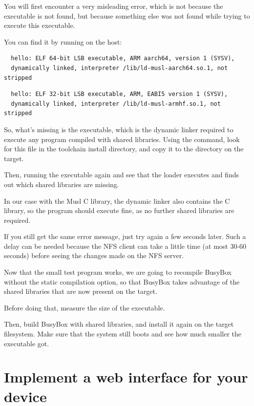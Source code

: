 You will first encounter a very misleading  error,
which is not because the  executable is not found, but
because something else was not found while trying to execute
this executable.

You can find it by running  on the host:

\if{}
\begin{verbatim}
  hello: ELF 64-bit LSB executable, ARM aarch64, version 1 (SYSV),
  dynamically linked, interpreter /lib/ld-musl-aarch64.so.1, not stripped
\end{verbatim}
\else
\begin{verbatim}
  hello: ELF 32-bit LSB executable, ARM, EABI5 version 1 (SYSV),
  dynamically linked, interpreter /lib/ld-musl-armhf.so.1, not stripped
\end{verbatim}
\fi

So, what's missing is the 
executable, which is the dynamic linker required to execute any
program compiled with shared libraries. Using the 
command, look for this file in the toolchain install directory,
and copy it to the  directory on the target.

Then, running the executable again and see that the loader executes
and finds out which shared libraries are missing.

In our case with the Musl C library, the dynamic linker also contains the
C library, so the program should execute fine, as no further shared
libraries are required.

If you still get the same error message, just try again a
few seconds later.  Such a delay can be needed because the NFS
client can take a little time (at most 30-60 seconds) before
seeing the changes made on the NFS server.

Now that the small test program works, we are going to recompile BusyBox
without the static compilation option, so that BusyBox takes
advantage of the shared libraries that are now present on the target.

Before doing that, measure the size of the  executable.

Then, build BusyBox with shared libraries, and install it again on the
target filesystem. Make sure that the system still boots and see how
much smaller the  executable got.

\section{Implement a web interface for your device}

